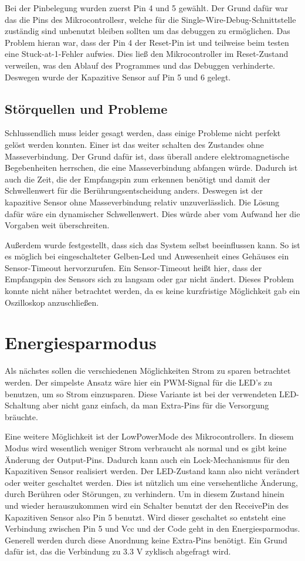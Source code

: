 \documentclass[a4paper,
DIV=13,
12pt,
BCOR=10mm,
department=FakEI,
parskip=half,
automark,
]{article}
\begin{document}
Bei der Pinbelegung wurden zuerst Pin 4 und 5 gewählt. Der Grund dafür war das die Pins des Mikrocontrollesr, welche für die Single-Wire-Debug-Schnittstelle zuständig sind unbenutzt bleiben sollten um das debuggen zu ermöglichen. Das Problem hieran war, dass der Pin 4 der Reset-Pin ist und teilweise beim testen eine Stuck-at-1-Fehler aufwies. Dies ließ den Mikrocontroller im Reset-Zustand verweilen, was den Ablauf des Programmes und das Debuggen verhinderte. Deswegen wurde der Kapazitive Sensor auf Pin 5 und 6 gelegt.
 
\subsection{Störquellen und Probleme}
Schlussendlich muss leider gesagt werden, dass einige Probleme nicht perfekt gelöst werden konnten. Einer ist das weiter schalten des Zustandes ohne Masseverbindung. Der Grund dafür ist, dass überall andere elektromagnetische Begebenheiten herrschen, die eine Masseverbindung abfangen würde. Dadurch ist auch die Zeit, die der Empfangspin zum erkennen benötigt und damit der Schwellenwert für die Berührungsentscheidung anders. Deswegen ist der kapazitive Sensor ohne Masseverbindung relativ unzuverlässlich. Die Lösung dafür wäre ein dynamischer Schwellenwert. Dies würde aber vom Aufwand her die Vorgaben weit überschreiten. 

Außerdem wurde festgestellt, dass sich das System selbst beeinflussen kann. So ist es möglich bei eingeschalteter Gelben-Led und Anwesenheit eines Gehäuses ein Sensor-Timeout hervorzurufen. Ein Sensor-Timeout heißt hier, dass der Empfangspin des Sensors sich zu langsam oder gar nicht ändert. Dieses Problem konnte nicht näher betrachtet werden, da es keine kurzfristige Möglichkeit gab ein Oszilloskop anzuschließen.



\newpage
\section{Energiesparmodus}
\label{Energie}
Als nächstes sollen die verschiedenen Möglichkeiten Strom zu sparen betrachtet werden. Der simpelste Ansatz wäre hier ein PWM-Signal für die LED's zu benutzen, um so Strom einzusparen. Diese Variante ist bei der verwendeten LED-Schaltung aber nicht ganz einfach, da man Extra-Pins für die Versorgung bräuchte. 

Eine weitere Möglichkeit ist der LowPowerMode des Mikrocontrollers. In diesem Modus wird wesentlich weniger Strom verbraucht als normal und es gibt keine Änderung der Output-Pins. Dadurch kann auch ein Lock-Mechanismus für den Kapazitiven Sensor realisiert werden. Der LED-Zustand kann also nicht verändert oder weiter geschaltet werden. Dies ist nützlich um eine versehentliche Änderung, durch Berühren oder Störungen, zu verhindern. Um in diesem Zustand hinein und wieder herauszukommen wird ein Schalter benutzt der den ReceivePin des Kapazitiven Sensor also Pin 5 benutzt. Wird dieser geschaltet so entsteht eine Verbindung zwischen Pin 5 und Vcc und der Code geht in den Energiesparmodus. Generell werden durch diese Anordnung keine Extra-Pins benötigt. Ein Grund dafür ist, das die Verbindung zu 3.3 V zyklisch abgefragt wird. 
\end{document}
